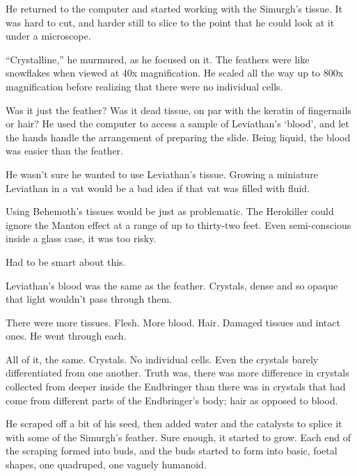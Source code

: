 He returned to the computer and started working with the Simurgh's tissue.  It was hard to cut, and harder still to slice to the point that he could look at it under a microscope.



``Crystalline,'' he murmured, as he focused on it.  The feathers were like snowflakes when viewed at 40x magnification.  He scaled all the way up to 800x magnification before realizing that there were no individual cells.



Was it just the feather?  Was it dead tissue, on par with the keratin of fingernails or hair?  He used the computer to access a sample of Leviathan's `blood', and let the hands handle the arrangement of preparing the slide.  Being liquid, the blood was easier than the feather.



He wasn't sure he wanted to use Leviathan's tissue.  Growing a miniature Leviathan in a vat would be a bad idea if that vat was filled with fluid.



Using Behemoth's tissues would be just as problematic.  The Herokiller could ignore the Manton effect at a range of up to thirty-two feet.  Even semi-conscious inside a glass case, it was too risky.



Had to be smart about this.



Leviathan's blood was the same as the feather.  Crystals, dense and so opaque that light wouldn't pass through them.



There were more tissues.  Flesh.  More blood.  Hair.  Damaged tissues and intact ones.  He went through each.



All of it, the same.  Crystals.  No individual cells.  Even the crystals barely differentiated from one another.  Truth was, there was more difference in crystals collected from deeper inside the Endbringer than there was in crystals that had come from different parts of the Endbringer's body; hair as opposed to blood.



He scraped off a bit of his seed, then added water and the catalysts to splice it with some of the Simurgh's feather.  Sure enough, it started to grow.  Each end of the scraping formed into buds, and the buds started to form into basic, foetal shapes, one quadruped, one vaguely humanoid.



